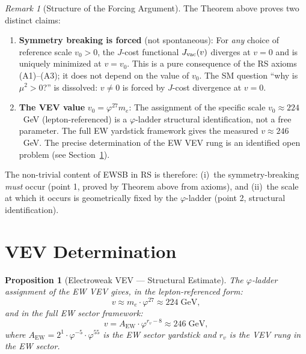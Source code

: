 \documentclass[12pt,a4paper]{article}
\newtheorem{proposition}[theorem]{Proposition}
\theoremstyle{definition}
\theoremstyle{remark}
\newtheorem{remark}[theorem]{Remark}
\begin{document}
\begin{remark}[Structure of the Forcing Argument]
The Theorem above proves two distinct claims:
\begin{enumerate}
  \item \textbf{Symmetry breaking is forced} (not spontaneous): For
  \emph{any} choice of reference scale $v_0 > 0$, the $J$-cost
  functional $J_{\rm vac}(v)$ diverges at $v = 0$ and is uniquely
  minimized at $v = v_0$.  This is a pure consequence of the RS axioms
  (A1)--(A3); it does not depend on the value of $v_0$.  The SM
  question ``why is $\mu^2 > 0$?'' is dissolved: $v \neq 0$ is
  forced by $J$-cost divergence at $v = 0$.
  \item \textbf{The VEV value} $v_0 = \varphi^{27} m_e$: The assignment
  of the specific scale $v_0 \approx 224$~GeV (lepton-referenced) is a
  $\varphi$-ladder structural identification, not a free parameter.  The
  full EW yardstick framework gives the measured $v \approx 246$~GeV.
  The precise determination of the EW VEV rung is an identified open
  problem (see Section~\ref{sec:vev}).
\end{enumerate}
The non-trivial content of EWSB in RS is therefore: (i)~the
symmetry-breaking \emph{must} occur (point 1, proved by Theorem
above from axioms), and (ii)~the scale at which it occurs is
geometrically fixed by the $\varphi$-ladder (point 2, structural
identification).
\end{remark}

\section{VEV Determination}
\label{sec:vev}

\begin{proposition}[Electroweak VEV --- Structural Estimate]
\label{thm:vev}
The $\varphi$-ladder assignment of the EW VEV gives, in the
lepton-referenced form:
\begin{equation}
  v \approx m_e \cdot \varphi^{27} \approx 224\;\mathrm{GeV},
  \label{eq:vev_approx}
\end{equation}
and in the full EW sector framework:
\begin{equation}
  \boxed{v = A_{\mathrm{EW}} \cdot \varphi^{r_v - 8}
  \approx 246\;\mathrm{GeV},}
  \label{eq:vev_full}
\end{equation}
where $A_{\mathrm{EW}} = 2^1 \cdot \varphi^{-5} \cdot \varphi^{55}$
is the EW sector yardstick and $r_v$ is the VEV rung in the EW sector.
\end{proposition}
\end{document}
